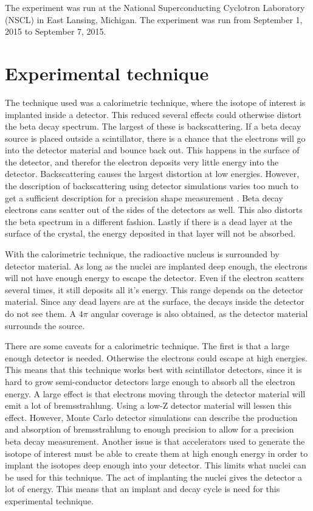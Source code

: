 \documentclass[main.tex]{subfiles}
\begin{document}
The experiment was run at the National Superconducting Cyclotron Laboratory (NSCL) in East Lansing, Michigan. 
The experiment was run from September 1, 2015 to September 7, 2015.

\section{Experimental technique}
The technique used was a calorimetric technique, where the isotope of interest is implanted inside a detector.
This reduced several effects could otherwise distort the beta decay spectrum.
The largest of these is backscattering.
If a beta decay source is placed outside a scintillator, there is a chance that the electrons will go into the detector material and bounce back out.
This happens in the surface of the detector, and therefor the electron deposits very little energy into the detector. 
Backscattering causes the largest distortion at low energies.
However, the description of backscattering using detector simulations varies too much to get a sufficient description for a precision shape measurement \cite{Huy18}.
Beta decay electrons cans scatter out of the sides of the detectors as well. 
This also distorts the beta spectrum in a different fashion. 
Lastly if there is a dead layer at the surface of the crystal, the energy deposited in that layer will not be absorbed.

With the calorimetric technique, the radioactive nucleus is surrounded by detector material.
As long as the nuclei are implanted deep enough, the electrons will not have enough energy to escape the detector.
Even if the electron scatters several times, it still deposits all it's energy.
This range depends on the detector material.
Since any dead layers are at the surface, the decays inside the detector do not see them.
A $4\pi$ angular coverage is also obtained, as the detector material surrounds the source.

There are some caveats for a calorimetric technique. 
The first is that a large enough detector is needed.
Otherwise the electrons could escape at high energies.
This means that this technique works best with scintillator detectors, since it is hard to grow semi-conductor detectors large enough to absorb all the electron energy.  
A large effect is that electrons moving through the detector material will emit a lot of bremsstrahlung.
Using a low-Z detector material will lessen this effect.
However, Monte Carlo detector simulations can describe the production and absorption of bremsstrahlung to enough precision to allow for a precision beta decay measurement. 
Another issue is that accelerators used to generate the isotope of interest must be able to create them at high enough energy in order to implant the isotopes deep enough into your detector.
This limits what nuclei can be used for this technique.
The act of implanting the nuclei gives the detector a lot of energy. 
This means that an implant and decay cycle is need for this experimental technique.
\end{document}
